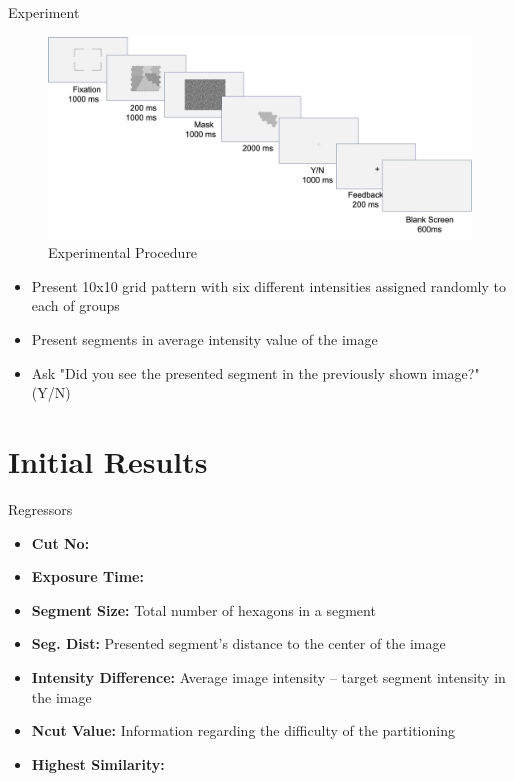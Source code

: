 \documentclass[10pt,xcolor=svgnames]{beamer} %
\begin{document}
\begin{frame}{Experiment}
    \begin{figure}
    \centering
        \includegraphics[width = \textwidth]{pictures/ExperimentalProcedure.png}   
    \caption{\footnotesize Experimental Procedure}
    \end{figure}    
    \vspace{-0.5cm}

    \begin{itemize}
        \footnotesize
        \item Present 10x10 grid pattern with six different intensities assigned randomly to each of groups 
        \item Present segments in average intensity value of the image
        \item Ask "Did you see the presented segment in the previously shown image?" (Y/N)
    \end{itemize}
\end{frame}
\section{Initial Results}

\begin{frame}{Regressors}
    \begin{itemize}        
        \item  \textbf{Cut No:} 
        \item  \textbf{Exposure Time:}
        \item  \textbf{Segment Size:} Total number of hexagons in a segment
        \item  \textbf{Seg. Dist:} Presented segment’s distance to the center of the image
        \item  \textbf{Intensity Difference:} Average image intensity – target segment intensity in the image
        \item  \textbf{Ncut Value:} Information regarding the difficulty of the partitioning
        \item  \textbf{Highest Similarity:} 
    \end{itemize}
\end{frame}
\end{document}
